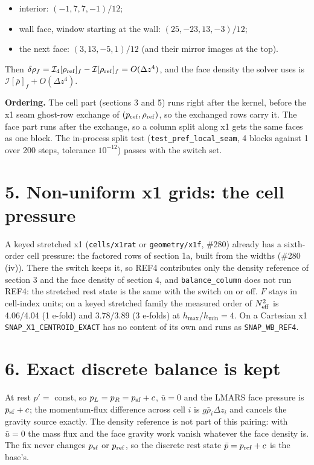 \documentclass[11pt,a4paper]{article}
\begin{document}
\begin{itemize}
\item interior: $(-1, 7, 7, -1)/12$;
\item wall face, window starting at the wall: $(25, -23, 13, -3)/12$;
\item the next face: $(3, 13, -5, 1)/12$ (and their mirror images at the top).
\end{itemize}

Then $\delta\rho_f = \mathcal I_4[\rho_{\rm ref}]_f - \mathcal I[\rho_{\rm ref}]_f = O(\Delta z^4)$, and the face
density the solver uses is $\mathcal I[\bar\rho]_f + O(\Delta z^4)$.

\textbf{Ordering.} The cell part (sections 3 and 5) runs right after the kernel, before the x1 seam ghost-row
exchange of $(p_{\rm ref}, \rho_{\rm ref})$, so the exchanged rows carry it. The face part runs after the
exchange, so a column split along x1 gets the same faces as one block. The in-process split test
(\texttt{test\_pref\_local\_seam}, 4 blocks against 1 over 200 steps, tolerance $10^{-12}$) passes with the switch set.

\section*{5. Non-uniform x1 grids: the cell pressure}

A keyed stretched x1 (\texttt{cells/x1rat} or \texttt{geometry/x1f}, \#280) already has a
sixth-order cell pressure: the factored rows of section 1a, built from the widths (\#280 (iv)). There the switch keeps it, so REF4 contributes only the density reference of section 3
and the face density of section 4, and \texttt{balance\_column} does not run REF4: the stretched rest state is the
same with the switch on or off. $F$ stays in cell-index units; on a keyed
stretched family the measured order of $N^2_{\rm eff}$ is 4.06/4.04 (1 e-fold) and 3.78/3.89 (3 e-folds) at
$h_{\max}/h_{\min} = 4$. On a Cartesian x1 \texttt{SNAP\_X1\_CENTROID\_EXACT} has no content of its own and runs as
\texttt{SNAP\_WB\_REF4}.

\section*{6. Exact discrete balance is kept}

At rest $p' = $ const, so $p_L = p_R = p_{\rm sf} + c$, $\bar u = 0$ and the LMARS face pressure is
$p_{\rm sf} + c$; the momentum-flux difference across cell $i$ is $g\bar\rho_i\Delta z_i$ and cancels the gravity
source exactly. The density reference is not part of this pairing: with $\bar u = 0$ the mass flux and the
face gravity work vanish whatever the face density is. The fix never changes $p_{\rm sf}$ or $p_{\rm ref}$, so
the discrete rest state $\bar p = p_{\rm ref} + c$ is the base's.
\end{document}
